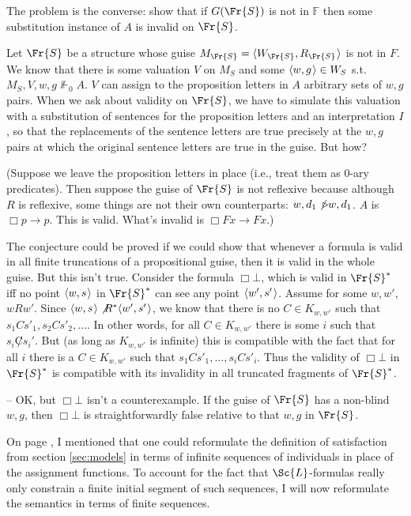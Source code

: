 \documentclass[11pt]{woarticle}
\theoremstyle{break}
\theoremstyle{nonumberplain}
\newcommand{\SAT}{\Vdash}
\newcommand{\Img}{\triangleright}
\newcommand{\1}{\;\,|\;\,}
\renewcommand{\t}[1]{\ensuremath{\langle #1  \makebox[.2ex]{}\rangle}}
\begin{document}
{  The problem is the converse: show that if $G(\Fr{S})$ is not in $\mathbb{F}$
  then some substitution instance of $A$ is invalid on $\Fr{S}$.

  Let $\Fr{S}$ be a structure whose guise
  $M_{\Fr{S}} = \t{W_{\Fr{S}},R_{\Fr{S}}}$ is not in $F$. We know that there is
  some valuation $V$ on $M_{S}$ and some $\t{w,g} \in W_{S}$ s.t.
  $M_S,V,w,g \not\SAT_{0} A$. $V$ can assign to the proposition letters in $A$
  arbitrary sets of $w,g$ pairs. When we ask about validity on $\Fr{S}$, we have to
  simulate this valuation with a substitution of sentences for the proposition
  letters and an interpretation $I$, so that the replacements of the sentence
  letters are true precisely at the $w,g$ pairs at which the original sentence
  letters are true in the guise. But how?

  (Suppose we leave the proposition letters in place (i.e., treat them as 0-ary
  predicates). Then suppose the guise of $\Fr{S}$ is not reflexive because
  although $R$ is reflexive, some things are not their own counterparts:
  $w,d_{1}\not\Img w,d_{1}$. $A$ is $\Box p \to p$. This is valid. What's
  invalid is $\Box Fx \to Fx$.)

  The conjecture could be proved if we could show that whenever a formula is
  valid in all finite truncations of a propositional guise, then it is valid in
  the whole guise. But this isn't true. Consider the formula $\Box \bot$, which
  is valid in $\Fr{S}^*$ iff no point $\t{w,s}$ in $\Fr{S}^*$ can see any point
  $\t{w',s'}$. Assume for some $w,w'$, $wRw'$. Since $\t{w,s}\not R^*\t{w',s'}$,
  we know that there is no $C \in K_{w,w'}$ such that
  $s_1 C s'_1, s_2 C s'_2, \ldots$. In other words, for all $C\in K_{w,w'}$
  there is some $i$ such that $s_i \not C s_i'$. But (as long as $K_{w,w'}$ is
  infinite) this is compatible with the fact that for all $i$ there is a
  $C \in K_{w,w'}$ such that $s_1 C s'_1,\ldots,s_i C s'_i$. Thus the validity
  of $\Box \bot$ in $\Fr{S}^*$ is compatible with its invalidity in all
  truncated fragments of $\Fr{S}^*$.

  -- OK, but $\Box \bot$ isn't a counterexample. If the guise of $\Fr{S}$ has a
  non-blind $w,g$, then $\Box \bot$ is straightforwardly false relative to that
  $w,g$ in $\Fr{S}$.

} %

On page \pageref{p:tarski-semantics}, I mentioned that one could reformulate the
definition of satisfaction from section \ref{sec:models} in terms of infinite
sequences of individuals in place of the assignment functions. To account for
the fact that $\Sc{L}$-formulas really only constrain a finite initial segment
of such sequences, I will now reformulate the semantics in terms of finite
sequences.
\end{document}
